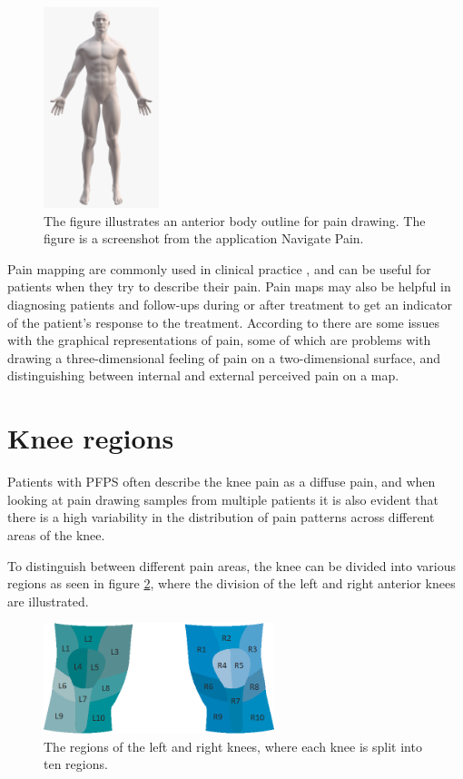 \begin{figure} [H]
\centering
\includegraphics[width=0.3\textwidth]{figures/painmap}
\caption{The figure illustrates an anterior body outline for pain drawing. The figure is a screenshot from the application Navigate Pain.}
\label{fig:painmap}
\end{figure}

\noindent
Pain mapping are commonly used in clinical practice \citep{Schott2010}, and can be useful for patients when they try to describe their pain. Pain maps may also be helpful in diagnosing patients and follow-ups during or after treatment to get an indicator of the patient’s response to the treatment.\citep{Boudreau2016}
According to \citeauthor{Schott2010} there are some issues with the graphical representations of pain, some of which are problems with drawing a three-dimensional feeling of pain on a two-dimensional surface, and distinguishing between internal and external perceived pain on a map.\citep{Schott2010}

\section{Knee regions}

Patients with PFPS often describe the knee pain as a diffuse pain, and when looking at pain drawing samples from multiple patients it is also evident that there is a high variability in the distribution of pain patterns across different areas of the knee.

\noindent
To distinguish between different pain areas, the knee can be divided into various regions as seen in figure \ref{fig:atlas}, where the division of the left and right anterior knees are illustrated. 

\begin{figure} [H] 
\centering
\includegraphics[width=0.6\textwidth]{figures/atlas}
\caption{The regions of the left and right knees, where each knee is split into ten regions.}
\label{fig:atlas}
\end{figure}

